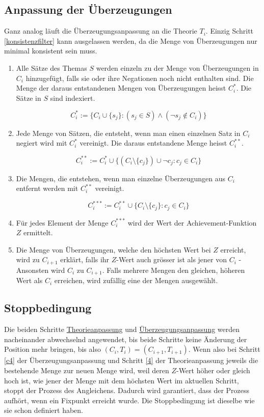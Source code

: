 \documentclass{article}
\begin{document}
\subsection{Anpassung der Überzeugungen} \label{C-Anpassung}
Ganz analog läuft die Überzeugungsanpassung an die Theorie $T_i$. Einzig Schritt \ref{konsistenzfilter} kann ausgelassen werden, da die Menge von Überzeugungen nur minimal konsistent sein muss.
\begin{enumerate}
    \item \label{c1} Alle Sätze des Themas $S$ werden einzeln zu der Menge von Überzeugungen in $C_i$ hinzugefügt, falls sie oder ihre Negationen noch nicht enthalten sind. Die Menge der daraus entstandenen Mengen von Überzeugungen heisst $C_i^*$. Die Sätze in $S$ sind indexiert.
    
    $$ 
    C_i^*:= \{ C_i \cup \{s_j\}: (s_j \in S) \land (\neg s_j \not\in C_i) \}
    $$
    
    \item \label{c1.1} Jede Menge von Sätzen, die entsteht, wenn man einen einzelnen Satz in $C_i$ negiert wird mit $C_i^*$ vereinigt. Die daraus entstandene Menge heisst $C_i^{**}$.
    
    $$
    C_i^{**}:= C_i^* \cup \{ (C_i \setminus \{c_j\}) \cup \neg c_j: c_j \in C_i\}
    $$
    
    \item \label{c2} Die Mengen, die entstehen, wenn man einzelne Überzeugungen aus $C_i$ entfernt werden mit $C_i^{**}$ vereinigt.
    
    $$
    C_i^{***}:= C_i^{**} \cup \{ C_i \setminus \{c_j\}: c_j \in C_i\}
    $$
    
    \item \label{c3} Für jedes Element der Menge $C_i^{***}$ wird der Wert der Achievement-Funktion $Z$ ermittelt.
    \item \label{c4}Die Menge von Überzeugungen, welche den höchsten Wert bei $Z$ erreicht, wird zu $C_{i+1}$ erklärt, falls ihr $Z$-Wert auch grösser ist als jener von $C_i$ - Ansonsten wird $C_i$ zu $C_{i+1}$. Falls mehrere Mengen den gleichen, höheren Wert als $C_i$ erreichen, wird zufällig eine der Mengen ausgewählt.\footnotemark[\value{footnote}]
\end{enumerate}

\subsection{Stoppbedingung}
Die beiden Schritte \hyperref[T-Anpassung]{Theorieanpassung} und \hyperref[C-Anpassung]{Überzeugungsanpassung} werden nacheinander abwechselnd angewendet, bis beide Schritte keine Änderung der Position mehr bringen, bis also $(C_i, T_i) = (C_{i+1}, T_{i+1})$. Wenn also bei Schritt \ref{c4} der Überzeugungsanpassung und Schritt \ref{4} der Theorieanpassung jeweils die bestehende Menge zur neuen Menge wird, weil deren $Z$-Wert höher oder gleich hoch ist, wie jener der Menge mit dem höchsten Wert im aktuellen Schritt, stoppt der Prozess des Angleichens. Dadurch wird garantiert, dass der Prozess aufhört, wenn ein Fixpunkt erreicht wurde. Die Stoppbedingung ist dieselbe wie \autocite[S. 11]{beisbart_making_2015} sie schon definiert haben.
\end{document}
